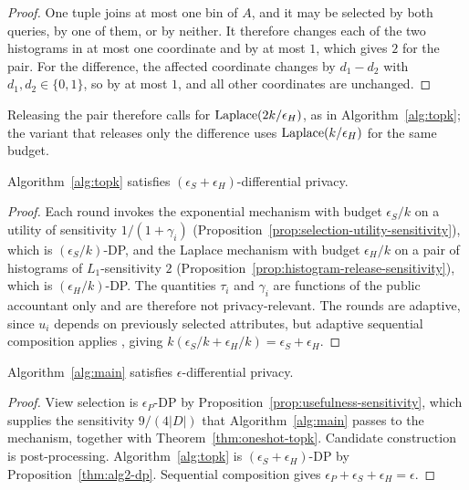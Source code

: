 \begin{proof}
One tuple joins at most one bin of $A$, and it may be selected by both queries, by one of them, or by neither.
It therefore changes each of the two histograms in at most one coordinate and by at most $1$, which gives $2$ for the pair.
For the difference, the affected coordinate changes by $d_1-d_2$ with $d_1,d_2\in\{0,1\}$, so by at most $1$, and all other coordinates are unchanged.
\end{proof}

Releasing the pair therefore calls for $\operatorname{Laplace}(2k/\epsilon_H)$, as in Algorithm~\ref{alg:topk}; the variant that releases only the difference uses $\operatorname{Laplace}(k/\epsilon_H)$ for the same budget.

\begin{proposition}
\label{thm:alg2-dp}
Algorithm~\ref{alg:topk} satisfies $(\epsilon_S+\epsilon_H)$-differential privacy.
\end{proposition}

\begin{proof}
Each round invokes the exponential mechanism with budget $\epsilon_S/k$ on a utility of sensitivity $1/(1+\gamma_i)$ (Proposition~\ref{prop:selection-utility-sensitivity}), which is $(\epsilon_S/k)$-DP, and the Laplace mechanism with budget $\epsilon_H/k$ on a pair of histograms of $L_1$-sensitivity $2$ (Proposition~\ref{prop:histogram-release-sensitivity}), which is $(\epsilon_H/k)$-DP.
The quantities $\tau_i$ and $\gamma_i$ are functions of the public accountant only and are therefore not privacy-relevant.
The rounds are adaptive, since $u_i$ depends on previously selected attributes, but adaptive sequential composition applies \cite{DBLP:series/synthesis/2016Li}, giving $k(\epsilon_S/k+\epsilon_H/k)=\epsilon_S+\epsilon_H$.
\end{proof}

\begin{proposition}
\label{thm:alg1-dp}
Algorithm~\ref{alg:main} satisfies $\epsilon$-differential privacy.
\end{proposition}

\begin{proof}
View selection is $\epsilon_P$-DP by Proposition~\ref{prop:usefulness-sensitivity}, which supplies the sensitivity $9/(4|D|)$ that Algorithm~\ref{alg:main} passes to the mechanism, together with Theorem~\ref{thm:oneshot-topk}.
Candidate construction is post-processing.
Algorithm~\ref{alg:topk} is $(\epsilon_S+\epsilon_H)$-DP by Proposition~\ref{thm:alg2-dp}.
Sequential composition gives $\epsilon_P+\epsilon_S+\epsilon_H=\epsilon$.
\end{proof}

